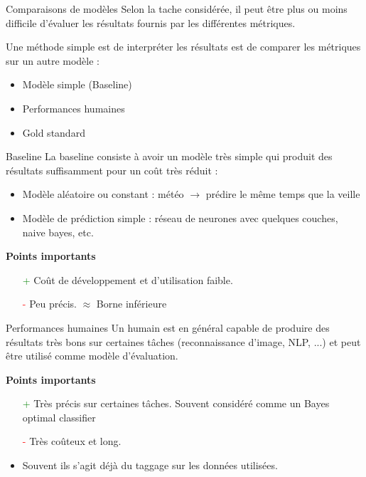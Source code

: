 \begin{frame}{Comparaisons de modèles}
Selon la tache considérée, il peut être plus ou moins difficile d'évaluer les résultats fournis par les différentes métriques.

Une méthode simple est de interpréter les résultats est de comparer les métriques sur un autre modèle :
\begin{itemize}
  \item Modèle simple (Baseline)
  \item Performances humaines
  \item Gold standard
\end{itemize}
\end{frame}

\begin{frame}{Baseline}
La baseline consiste à avoir un modèle très simple qui produit des résultats suffisamment pour un coût très réduit :
\begin{itemize}
  \item Modèle aléatoire ou constant : météo $\rightarrow$ prédire le même temps que la veille
  \item Modèle de prédiction simple : réseau de neurones avec quelques couches, naive bayes, etc.
\end{itemize}

\textbf{Points importants}
\begin{itemize}
  \item[\textcolor{green}{+}] Coût de développement et d'utilisation faible. 
  \item[\textcolor{red}{-}] Peu précis. $\approx$ Borne inférieure
\end{itemize}
\end{frame}

\begin{frame}{Performances humaines}
  Un humain est en général capable de produire des résultats très bons sur certaines tâches (reconnaissance d'image, NLP, ...) et peut être utilisé comme modèle d'évaluation.

\textbf{Points importants}
\begin{itemize}
  \item[\textcolor{green}{+}] Très précis sur certaines tâches. Souvent considéré comme un Bayes optimal classifier 
  \item[\textcolor{red}{-}] Très coûteux et long.
  \item Souvent ils s'agit déjà du taggage sur les données utilisées. 
\end{itemize}
\end{frame}

